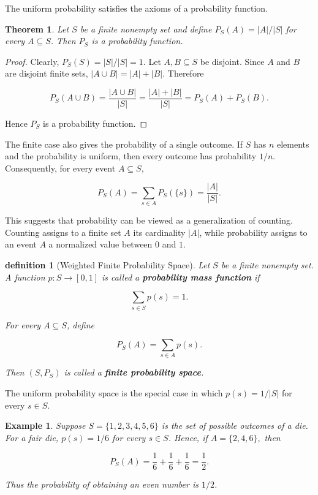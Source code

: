 \documentclass[10pt,a4paper]{book}
\newtheorem{definition}{definition}[section]
\newtheorem{theorem}{Theorem}[section]
\newtheorem{example}{Example}[section]
\begin{document}
The uniform probability satisfies the axioms of a probability function.

\begin{theorem}
    Let $S$ be a finite nonempty set and define $P_S(A)=|A|/|S|$ for every $A\subseteq S$. Then $P_S$ is a probability function.
\end{theorem}

\begin{proof}
    Clearly, $P_S(S)=|S|/|S|=1$. Let $A,B\subseteq S$ be disjoint. Since $A$ and $B$ are disjoint finite sets, $|A\cup B|=|A|+|B|$. Therefore

    $$
        P_S(A\cup B)
        =\frac{|A\cup B|}{|S|}
        =\frac{|A|+|B|}{|S|}
        =P_S(A)+P_S(B).
    $$

    Hence $P_S$ is a probability function.
\end{proof}

The finite case also gives the probability of a single outcome. If $S$ has $n$ elements and the probability is uniform, then every outcome has probability $1/n$. Consequently, for every event $A\subseteq S$,

$$
    P_S(A)=\sum_{s\in A}P_S(\{s\})
    =\frac{|A|}{|S|}.
$$

This suggests that probability can be viewed as a generalization of counting. Counting assigns to a finite set $A$ its cardinality $|A|$, while probability assigns to an event $A$ a normalized value between $0$ and $1$.

\begin{definition}[Weighted Finite Probability Space]
    Let $S$ be a finite nonempty set. A function $p:S\to[0,1]$ is called a \textbf{probability mass function} if

    $$
        \sum_{s\in S}p(s)=1.
    $$

    For every $A\subseteq S$, define

    $$
        P_S(A)=\sum_{s\in A}p(s).
    $$

    Then $(S,P_S)$ is called a \textbf{finite probability space}.
\end{definition}

The uniform probability space is the special case in which $p(s)=1/|S|$ for every $s\in S$.

\begin{example}
    Suppose
    $
        S=\{1,2,3,4,5,6\}
    $
    is the set of possible outcomes of a die. For a fair die, $p(s)=1/6$ for every $s\in S$. Hence, if
    $
        A=\{2,4,6\},
    $
    then

    $$
        P_S(A)=\frac16+\frac16+\frac16=\frac12.
    $$

    Thus the probability of obtaining an even number is $1/2$.
\end{example}
\end{document}
